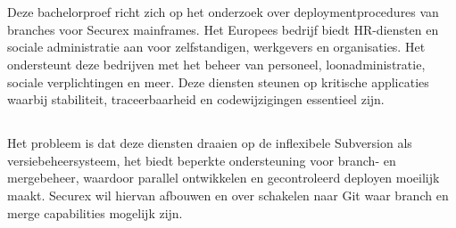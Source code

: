 
\chapter{}%
\label{ch:inleiding}

Deze bachelorproef richt zich op het onderzoek over deploymentprocedures van branches voor Securex mainframes. Het Europees bedrijf biedt HR-diensten en sociale administratie aan voor zelfstandigen, werkgevers en organisaties. Het ondersteunt deze bedrijven met het beheer van personeel, loonadministratie, sociale verplichtingen en meer. Deze diensten steunen op kritische applicaties waarbij stabiliteit, traceerbaarheid en codewijzigingen essentieel zijn. 



\section{}%
\label{sec:probleemstelling}

Het probleem is dat deze diensten draaien op de inflexibele Subversion als versiebeheersysteem, het biedt beperkte ondersteuning voor branch- en mergebeheer, waardoor parallel ontwikkelen en gecontroleerd deployen moeilijk maakt. Securex wil hiervan afbouwen en over schakelen naar Git waar branch en merge capabilities mogelijk zijn.

